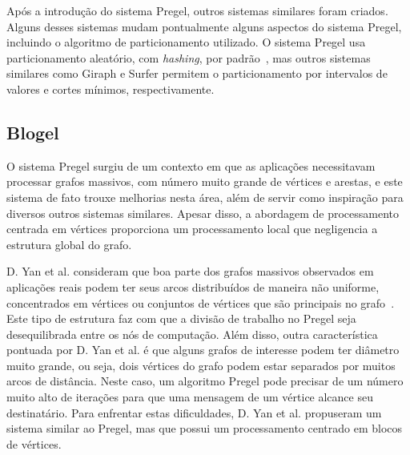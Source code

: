 \documentclass[conference]{IEEEtran}
\begin{document}
%
%
Após a introdução do sistema Pregel, outros sistemas similares foram
criados. Alguns desses sistemas mudam pontualmente alguns aspectos do
sistema Pregel, incluindo o algoritmo de particionamento utilizado.
O sistema Pregel usa particionamento aleatório, com {\em hashing}, por
padrão~\cite{pregel}, mas outros sistemas similares como Giraph e Surfer
permitem o particionamento por intervalos de valores e cortes mínimos,
respectivamente.

\subsection{Blogel}




O sistema Pregel surgiu de um contexto em que as aplicações necessitavam
processar grafos massivos, com número muito grande de vértices e
arestas, e este sistema de fato trouxe melhorias nesta área, além de
servir como inspiração para diversos outros sistemas similares. Apesar
disso, a abordagem de processamento centrada em vértices proporciona um
processamento local que negligencia a estrutura global do grafo.

D. Yan et al. consideram que boa parte dos grafos massivos observados em
aplicações reais podem ter seus arcos distribuídos de maneira não
uniforme, concentrados em vértices ou conjuntos de vértices que são
principais no grafo~\cite{blogel}. Este tipo de estrutura faz com que a
divisão de trabalho no Pregel seja desequilibrada entre os nós de
computação. Além disso, outra característica pontuada por D. Yan et al.
é que alguns grafos de interesse podem ter diâmetro muito grande, ou
seja, dois vértices do grafo podem estar separados por muitos arcos de
distância. Neste caso, um algoritmo Pregel pode precisar de um número
muito alto de iterações para que uma mensagem de um vértice alcance seu
destinatário. Para enfrentar estas dificuldades, D. Yan et al.
propuseram um sistema similar ao Pregel, mas que possui um processamento
centrado em blocos de vértices.
\end{document}
